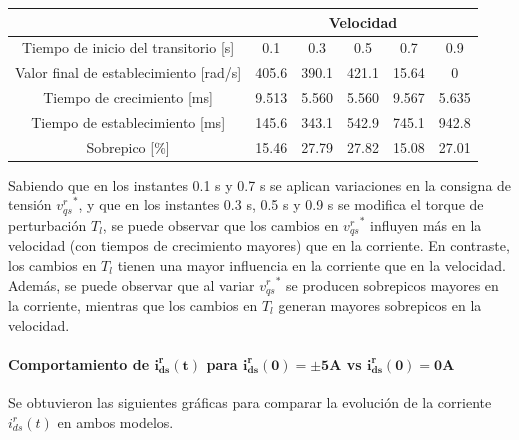\documentclass[a4paper, 10pt, onecolumn,journal]{ieeeconf}
\begin{document}
\begin{table}[H]
	\centering
	\begin{tabular}{|c|ccccc|}
		\hline
		& \multicolumn{5}{c|}{Velocidad}                                                                                            \\ \hline
		Tiempo de inicio del transitorio {[}s{]}   & \multicolumn{1}{c|}{0.1}   & \multicolumn{1}{c|}{0.3}   & \multicolumn{1}{c|}{0.5}   & \multicolumn{1}{c|}{0.7}   & 0.9   \\ \hline
		Valor final de establecimiento {[}rad/s{]} & \multicolumn{1}{c|}{405.6} & \multicolumn{1}{c|}{390.1} & \multicolumn{1}{c|}{421.1} & \multicolumn{1}{c|}{15.64} & 0     \\ \hline
		Tiempo de crecimiento {[}ms{]}             & \multicolumn{1}{c|}{9.513} & \multicolumn{1}{c|}{5.560} & \multicolumn{1}{c|}{5.560} & \multicolumn{1}{c|}{9.567} & 5.635 \\ \hline
		Tiempo de establecimiento {[}ms{]}         & \multicolumn{1}{c|}{145.6} & \multicolumn{1}{c|}{343.1} & \multicolumn{1}{c|}{542.9} & \multicolumn{1}{c|}{745.1} & 942.8 \\ \hline
		Sobrepico {[}\%{]}                         & \multicolumn{1}{c|}{15.46} & \multicolumn{1}{c|}{27.79} & \multicolumn{1}{c|}{27.82} & \multicolumn{1}{c|}{15.08} & 27.01 \\ \hline
	\end{tabular}
\end{table}


Sabiendo que en los instantes 0.1 s y 0.7 s se aplican variaciones en la consigna de tensión ${v^r_{qs}}^*$, y que en los instantes 0.3 s, 0.5 s y 0.9 s se modifica el torque de perturbación $T_l$, se puede observar que los cambios en ${v^r_{qs}}^*$ influyen más en la velocidad (con tiempos de crecimiento mayores) que en la corriente. En contraste, los cambios en $T_l$ tienen una mayor influencia en la corriente que en la velocidad. Además, se puede observar que al variar ${v^r_{qs}}^*$ se producen sobrepicos mayores en la corriente, mientras que los cambios en $T_l$ generan mayores sobrepicos en la velocidad.

\paragraph{\textbf{Comportamiento de $\mathbf{i^r_{ds}(t)}$ para $\mathbf{i^r_{ds}(0) = \pm 5A}$ vs $\mathbf{i^r_{ds}(0) = 0A}$}} 
Se obtuvieron las siguientes gráficas para comparar la evolución de la corriente $i^r_{ds}(t)$ en ambos modelos.
\end{document}
